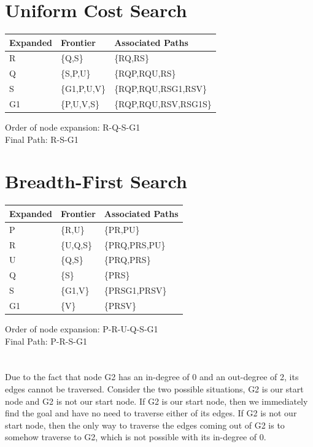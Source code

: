\documentclass{article}
\begin{document}
    \section{Uniform Cost Search}
        \begin{center}
            \begin{tabularx}{\textwidth}{|X|X|X|}
                \hline
                Expanded & Frontier & Associated Paths\\\hline
                R & \{Q,S\} & \{RQ,RS\}\\\hline
                Q & \{S,P,U\} & \{RQP,RQU,RS\}\\\hline
                S & \{G1,P,U,V\} & \{RQP,RQU,RSG1,RSV\}\\\hline
                G1 & \{P,U,V,S\} & \{RQP,RQU,RSV,RSG1S\}\\\hline
            \end{tabularx}
        \end{center}
        Order of node expansion: R-Q-S-G1\\
        Final Path: R-S-G1\\[0.2in]
    \section{Breadth-First Search}
        \begin{center}
            \begin{tabularx}{\textwidth}{|X|X|X|}
                \hline
                Expanded & Frontier & Associated Paths\\\hline
                P & \{R,U\} & \{PR,PU\}\\\hline
                R & \{U,Q,S\} & \{PRQ,PRS,PU\}\\\hline
                U & \{Q,S\} & \{PRQ,PRS\}\\\hline
                Q & \{S\} & \{PRS\}\\\hline
                S & \{G1,V\} & \{PRSG1,PRSV\}\\\hline
                G1 & \{V\} & \{PRSV\}\\\hline
            \end{tabularx}
        \end{center}
        Order of node expansion: P-R-U-Q-S-G1\\
        Final Path: P-R-S-G1\\
    \section{}
        Due to the fact that node G2 has an in-degree of 0 and an out-degree of 2, its edges cannot be traversed. Consider the two possible situations, G2 is our start node and G2 is not our start node. If G2 is our start node, then we immediately find the goal and have no need to traverse either of its edges. If G2 is not our start node, then the only way to traverse the edges coming out of G2 is to somehow traverse to G2, which is not possible with its in-degree of 0.\\
\end{document}
